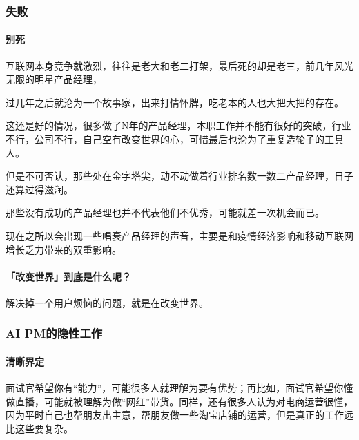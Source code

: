 \documentclass[letterpaper,10pt,english]{sphinxmanual}
\begin{document}
\subsubsection{失败}
\label{\detokenize{chapter_experience/fail:id1}}\label{\detokenize{chapter_experience/fail::doc}}

\paragraph{别死}
\label{\detokenize{chapter_experience/fail:id2}}
互联网本身竞争就激烈，往往是老大和老二打架，最后死的却是老三，前几年风光无限的明星产品经理，

过几年之后就沦为一个故事家，出来打情怀牌，吃老本的人也大把大把的存在。

这还是好的情况，很多做了N年的产品经理，本职工作并不能有很好的突破，行业不行，公司不行，自己空有改变世界的心，可惜最后也沦为了重复造轮子的工具人。

但是不可否认，那些处在金字塔尖，动不动做着行业排名数一数二产品经理，日子还算过得滋润。

那些没有成功的产品经理也并不代表他们不优秀，可能就差一次机会而已。

现在之所以会出现一些唱衰产品经理的声音，主要是和疫情经济影响和移动互联网增长乏力带来的双重影响。


\paragraph{「改变世界」到底是什么呢？}
\label{\detokenize{chapter_experience/fail:id3}}
解决掉一个用户烦恼的问题，就是在改变世界。


\subsubsection{AI PM的隐性工作}
\label{\detokenize{chapter_experience/recessive_work:ai-pm}}\label{\detokenize{chapter_experience/recessive_work::doc}}

\paragraph{清晰界定}
\label{\detokenize{chapter_experience/recessive_work:id1}}
面试官希望你有“能力”，可能很多人就理解为要有优势；再比如，面试官希望你懂做直播，可能就被理解为做“网红”带货。同样，还有很多人认为对电商运营很懂，因为平时自己也帮朋友出主意，帮朋友做一些淘宝店铺的运营，但是真正的工作远比这些要复杂。
%
\begin{footnote}[700]\sphinxAtStartFootnote
{}
%
\end{footnote}
\end{document}
